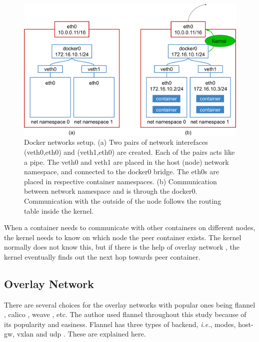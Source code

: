 \begin{figure}[h]
  \centering
  \includegraphics[width=0.95\columnwidth]{Figs/bridge+veth}

  \par\bigskip
  \centering
  \begin{minipage}{0.9\columnwidth}
    \caption[Docker networks setup]{
      Docker networks setup.
      (a) Two pairs of network interefaces (veth0,eth0) and (veth1,eth0) are created.
      Each of the pairs acts like a pipe.
      The veth0 and veth1 are placed in the host (node) network namespace, and connected to the docker0 bridge.
      The eth0s are placed in respective container namespaces.
      (b) Communication between network namespace  and  is through the docker0.
      Communication with the outside of the node follows the routing table inside the kernel.
    }
    \label{fig:bridge+veth}
  \end{minipage}
\end{figure}
 
When a container needs to communicate with other containers on different nodes, the kernel needs to know on which node the peer container exists.
The kernel normally does not know this, but if there is the help of overlay network \cite{zismer2016performance}, the kernel eventually finds out the next hop towards peer container.

\FloatBarrier

\subsection{Overlay Network}

There are several choices for the overlay networks with popular ones being flannel \cite{CoreOSFlannel}, calico \cite{ProjectCalico}, weave \cite{WeaveNet}, etc.
The author used flannel throughout this study because of its popularity and easiness.
Flannel has three types of backend, {\it i.e.},  modes, host-gw, vxlan\deleted[id=5th]{,} and udp \cite{CoreOSFlannelBackend}.
These are explained here.


